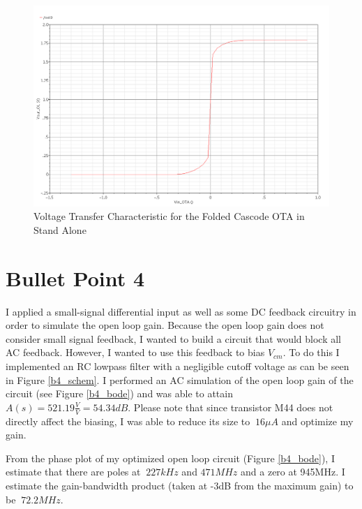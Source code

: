 \documentclass{article}
\begin{document}
\begin{figure}[H]
\centering
\includegraphics[width=6in]{bullet3.png}
\caption{Voltage Transfer Characteristic for the Folded Cascode OTA in Stand Alone}
\label{b3}
\end{figure}
\newpage

\section{Bullet Point 4}
I applied a small-signal differential input as well as some DC feedback circuitry in order to simulate the open loop gain. Because the open loop gain does not consider small signal feedback, I wanted to build a  circuit that would block all AC feedback. However, I wanted to use this feedback to bias $V_{cm}$. To do this I implemented an RC lowpass filter with a negligible cutoff voltage as can be seen in Figure \ref{b4_schem}. I performed an AC simulation of the open loop gain of the circuit (see Figure \ref{b4_bode}) and was able to attain $A(s) = 521.19\frac{V}{V} = 54.34dB$. Please note that since transistor M44 does not directly affect the biasing, I was able to reduce its size to $~16\mu A$ and optimize my gain.

From the phase plot of my optimized open loop circuit (Figure \ref{b4_bode}), I estimate that there are poles at $~227kHz$ and $471MHz$ and a zero at 945MHz. I estimate the gain-bandwidth product (taken at -3dB from the maximum gain) to be $~72.2MHz$.
\end{document}

